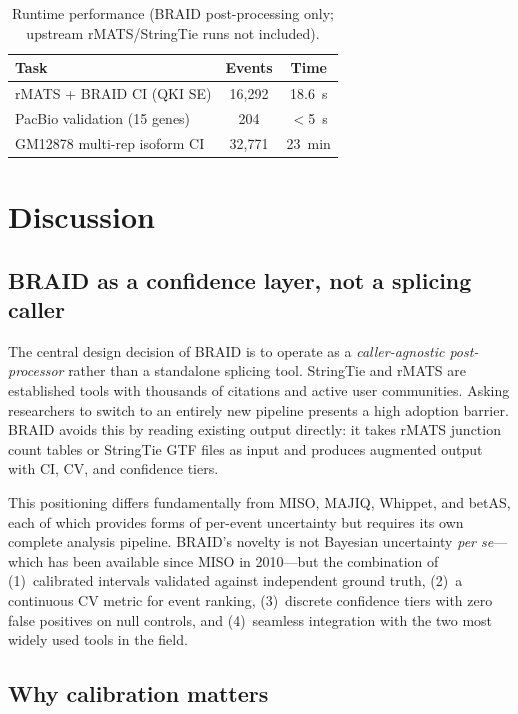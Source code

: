 \documentclass[10pt]{article}
\begin{document}
\begin{table}[htbp]
\centering
\caption{Runtime performance (BRAID post-processing only; upstream rMATS/StringTie runs not included).}
\label{tab:runtime}
\begin{tabular}{lcc}
\toprule
Task & Events & Time \\
\midrule
rMATS + BRAID CI (QKI SE) & 16,292 & 18.6~s \\
PacBio validation (15 genes) & 204 & $<$5~s \\
GM12878 multi-rep isoform CI & 32,771 & 23~min \\
\bottomrule
\end{tabular}
\end{table}

\section*{Discussion}

\subsection*{BRAID as a confidence layer, not a splicing caller}

The central design decision of BRAID is to operate as a \textit{caller-agnostic post-processor} rather than a standalone splicing tool.
StringTie and rMATS are established tools with thousands of citations and active user communities.
Asking researchers to switch to an entirely new pipeline presents a high adoption barrier.
BRAID avoids this by reading existing output directly: it takes rMATS junction count tables or StringTie GTF files as input and produces augmented output with CI, CV, and confidence tiers.

This positioning differs fundamentally from MISO\citep{katz2010}, MAJIQ\citep{vaquero2016}, Whippet\citep{sterne2018}, and betAS\citep{vasconcelos2024}, each of which provides forms of per-event uncertainty but requires its own complete analysis pipeline.
BRAID's novelty is not Bayesian uncertainty \textit{per se}---which has been available since MISO in 2010---but the combination of (1)~calibrated intervals validated against independent ground truth, (2)~a continuous CV metric for event ranking, (3)~discrete confidence tiers with zero false positives on null controls, and (4)~seamless integration with the two most widely used tools in the field.

\subsection*{Why calibration matters}
\end{document}
